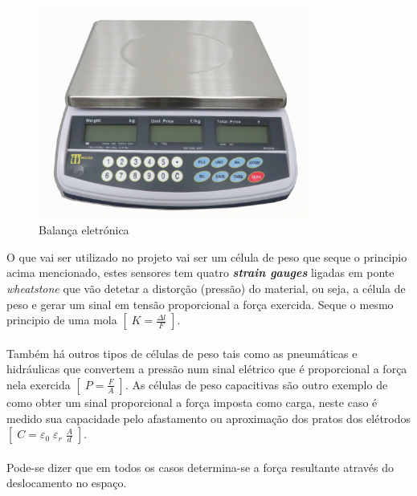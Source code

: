 \begin{figure}[H]
	\centering
	\includegraphics[height=7cm]{./image/PESTA/general/Scale_1.jpg}
	\caption{Balança eletrónica}
	\label{Sale}
\end{figure}
O que vai ser utilizado no projeto vai ser um célula de peso que seque o principio acima mencionado, estes sensores tem quatro \textit{\textbf{strain gauges}} ligadas em ponte \textit{wheatstone} que vão detetar a distorção (pressão) do material, ou seja, a célula de peso e gerar um sinal em tensão proporcional a força exercida. Seque o mesmo principio de uma mola $ [ \; K = \frac{\Delta l}{F} \; ] $.
\\
\\
Também há outros tipos de células de peso tais como as pneumáticas e hidráulicas que convertem a pressão num sinal elétrico que é proporcional a força nela exercida $ [ \; P = \frac{F}{A} \; ] $. As células de peso capacitivas são outro exemplo de como obter um sinal proporcional a força imposta como carga, neste caso é medido sua capacidade pelo afastamento ou aproximação dos pratos dos elétrodos $ [ \; C = \varepsilon_{0} \; \varepsilon_{r} \; \frac{A}{d} \; ] $.
\\
\\
Pode-se dizer que em todos os casos determina-se a força resultante através do deslocamento no espaço.
